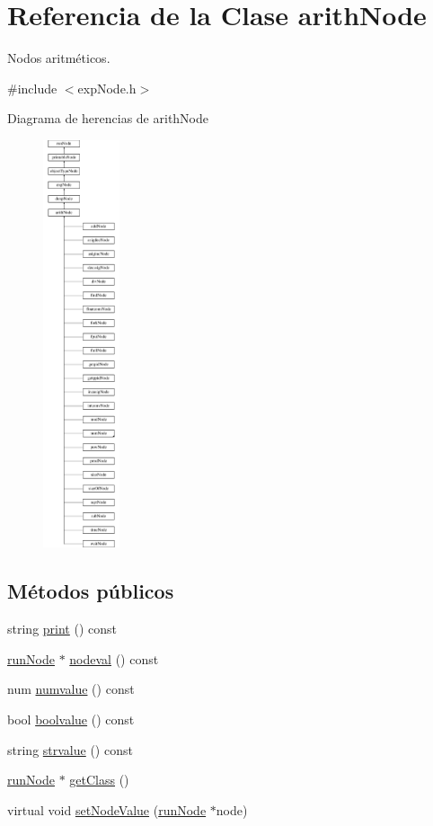 \hypertarget{classarithNode}{\section{Referencia de la Clase arith\-Node}
\label{classarithNode}
}


Nodos aritméticos.  




{\ttfamily \#include $<$exp\-Node.\-h$>$}

Diagrama de herencias de arith\-Node\begin{figure}[H]
\begin{center}
\leavevmode
\includegraphics[height=12.000000cm]{classarithNode}
\end{center}
\end{figure}
\subsection*{Métodos públicos}
\begin{DoxyCompactItemize}
\item 
string \hyperlink{classarithNode_a8550d65d4f403ef6526bc7be240879b3}{print} () const 
\item 
\hyperlink{classrunNode}{run\-Node} $\ast$ \hyperlink{classarithNode_a5a8581334f3d1757085fb88278103dc9}{nodeval} () const 
\item 
num \hyperlink{classarithNode_a3914e65779e61750f1ffd528deabd120}{numvalue} () const 
\item 
bool \hyperlink{classarithNode_a7f3634eba193b245af5e3ba8081c017b}{boolvalue} () const 
\item 
string \hyperlink{classarithNode_a01f251d6cdc918309873c7443c694510}{strvalue} () const 
\item 
\hyperlink{classrunNode}{run\-Node} $\ast$ \hyperlink{classarithNode_a870a354180acd033140f1d2c2fcde5a6}{get\-Class} ()
\item 
virtual void \hyperlink{classarithNode_aa10435f1e329336baee9334df7a8b0cf}{set\-Node\-Value} (\hyperlink{classrunNode}{run\-Node} $\ast$node)
\end{DoxyCompactItemize}
